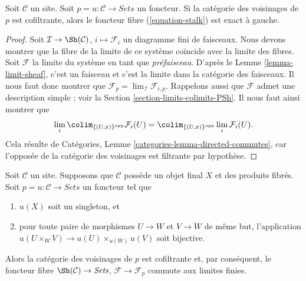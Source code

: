 \begin{lemma}
\label{lemma-neighbourhoods-cofiltered}
Soit $\mathcal{C}$ un site. Soit $p = u : \mathcal{C} \to \textit{Sets}$
un foncteur. Si la catégorie des voisinages de $p$ est
cofiltrante, alors le foncteur fibre (\ref{equation-stalk})
est exact à gauche.
\end{lemma}

\begin{proof}
Soit $\mathcal{I} \to \Sh(\mathcal{C})$,
$i \mapsto \mathcal{F}_i$ un diagramme fini de faisceaux.
Nous devons montrer que la fibre de la limite de ce
système coïncide avec la limite des fibres.
Soit $\mathcal{F}$ la limite du système en tant que {\it préfaisceau}.
D’après le Lemme \ref{lemma-limit-sheaf}, c’est un faisceau et
c’est la limite dans la catégorie des faisceaux.
Il nous faut donc montrer que
$\mathcal{F}_p = \lim_\mathcal{I} \mathcal{F}_{i, p}$.
Rappelons aussi que $\mathcal{F}$ admet une description simple ; voir la
Section \ref{section-limits-colimits-PSh}. Il nous faut ainsi montrer que
$$
\lim_i \colim_{\{(U, x)\}^{opp}} \mathcal{F}_i(U)
=
\colim_{\{(U, x)\}^{opp}} \lim_i \mathcal{F}_i(U).
$$
Cela résulte de Catégories, Lemme \ref{categories-lemma-directed-commutes},
car l’opposée de la catégorie des voisinages est filtrante
par hypothèse.
\end{proof}

\begin{lemma}
\label{lemma-neighbourhoods-directed}
Soit $\mathcal{C}$ un site. Supposons que $\mathcal{C}$ possède
un objet final $X$ et des produits fibrés.
Soit $p = u : \mathcal{C} \to \textit{Sets}$ un foncteur tel que
\begin{enumerate}
\item $u(X)$ soit un singleton, et
\item pour toute paire de morphismes $U \to W$ et $V \to W$ de
même but, l’application
$u(U \times_W V) \to u(U) \times_{u(W)} u(V)$ soit bijective.
\end{enumerate}
Alors la catégorie des voisinages de $p$ est cofiltrante
et, par conséquent, le foncteur fibre $\Sh(\mathcal{C}) \to \textit{Sets}$,
$\mathcal{F} \to \mathcal{F}_p$ commute aux limites finies.
\end{lemma}

